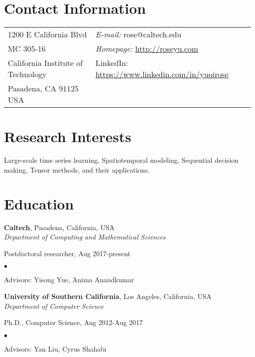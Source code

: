 \documentclass[margin,line]{res}
\newenvironment{list1}{
  \begin{list}{\ding{113}}{%
      \setlength{\itemsep}{0in}
      \setlength{\parsep}{0in} \setlength{\parskip}{0in}
      \setlength{\topsep}{0in} \setlength{\partopsep}{0in} 
      \setlength{\leftmargin}{0.17in}}}{\end{list}}
\newenvironment{list2}{
  \begin{list}{$\bullet$}{%
      \setlength{\itemsep}{0in}
      \setlength{\parsep}{0in} \setlength{\parskip}{0in}
      \setlength{\topsep}{0in} \setlength{\partopsep}{0in} 
      \setlength{\leftmargin}{0.2in}}}{\end{list}}
\begin{document}

\begin{resume}
\section{\sc Contact Information}
\vspace{.05in}
\begin{tabular}{@{}p{2in}p{4in}}
1200 E California Blvd  & {\it E-mail:}  rose@caltech.edu  \\   
MC 305-16 &  {\it Homepage:} \url{http://roseyu.com} \\            
California Institute of Technology & {LinkedIn:}  \url{https://www.linkedin.com/in/yuqirose}\\
Pasadena, CA 91125 USA  & \\     
\end{tabular}


\section{\sc Research Interests}
Large-scale time series learning, Spatiotemporal modeling, Sequential decision making, Tensor methods, and their applications.

\section{\sc Education}
{\bf Caltech}, Pasadena, California, USA\\
{\em Department of Computing and Mathematical Sciences} 
\begin{list1}
	\item[] Postdoctoral researcher,  Aug 2017-present
	\begin{list2}
		\vspace*{.05in}
		\item Advisors:  Yisong Yue, Anima Anandkumar
	\end{list2}
\vspace*{.05in}
\end{list1}

{\bf University of Southern California}, Los Angeles, California, USA\\
{\em Department of Computer Science} 
\begin{list1}
\item[] Ph.D., Computer Science,  Aug 2012-Aug 2017
\begin{list2}
\vspace*{.05in}
\item Advisors:  Yan Liu, Cyrus Shahabi
\end{list2}



\end{list1}
\end{resume}
\end{document}
